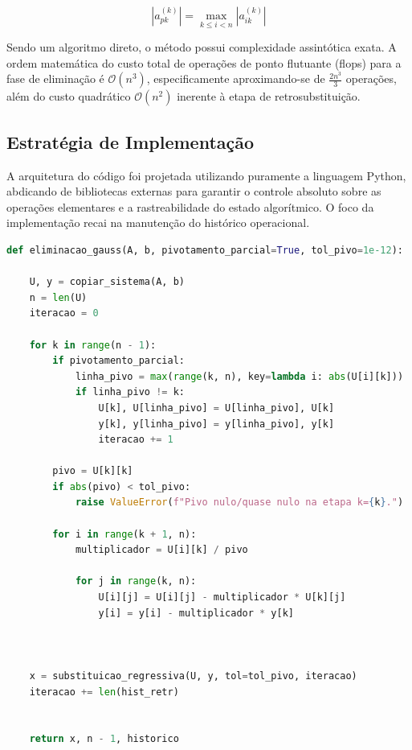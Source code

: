 \begin{equation}
    |a_{pk}^{(k)}| = \max_{k \leq i < n} |a_{ik}^{(k)}|
\end{equation}

Sendo um algoritmo direto, o método possui complexidade assintótica exata. A ordem matemática do custo total de operações de ponto flutuante (flops) para a fase de eliminação é $\mathcal{O}(n^3)$, especificamente aproximando-se de $\frac{2n^3}{3}$ operações, além do custo quadrático $\mathcal{O}(n^2)$ inerente à etapa de retrosubstituição.

\subsection{Estratégia de Implementação}

A arquitetura do código foi projetada utilizando puramente a linguagem Python, abdicando de bibliotecas externas para garantir o controle absoluto sobre as operações elementares e a rastreabilidade do estado algorítmico. O foco da implementação recai na manutenção do histórico operacional.

\begin{lstlisting}[language=Python, caption={Implementação do Método de Eliminação de Gauss com Pivotamento}, label={lst:gauss}]
def eliminacao_gauss(A, b, pivotamento_parcial=True, tol_pivo=1e-12):
   
    U, y = copiar_sistema(A, b)
    n = len(U)
    iteracao = 0

    for k in range(n - 1):
        if pivotamento_parcial:
            linha_pivo = max(range(k, n), key=lambda i: abs(U[i][k]))
            if linha_pivo != k:
                U[k], U[linha_pivo] = U[linha_pivo], U[k]
                y[k], y[linha_pivo] = y[linha_pivo], y[k]
                iteracao += 1

        pivo = U[k][k]
        if abs(pivo) < tol_pivo:
            raise ValueError(f"Pivo nulo/quase nulo na etapa k={k}.")

        for i in range(k + 1, n):
            multiplicador = U[i][k] / pivo

            for j in range(k, n):
                U[i][j] = U[i][j] - multiplicador * U[k][j]
                y[i] = y[i] - multiplicador * y[k]

           

    x = substituicao_regressiva(U, y, tol=tol_pivo, iteracao)
    iteracao += len(hist_retr)
    

    return x, n - 1, historico
\end{lstlisting}

